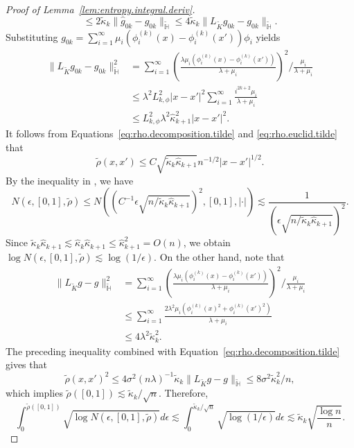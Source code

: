 \documentclass[12pt]{article}
\newcommand{\bbH}{\mathbb{H}}
\newcommand{\s}{\sum_{i=1}^{\infty}}
\theoremstyle{plain}
\theoremstyle{nonitalicremark}
\begin{document}
\begin{appendices}
\begin{proof}[Proof of Lemma~\ref{lem:entropy.integral.deriv}]
\begin{equation}
\leq 2\tilde{\kappa}_{k}\|\hat{g}_{0k}-g_{0k}\|_{\tilde{\bbH}} \leq 4\tilde{\kappa}_{k}\|L_{\tilde{K}}g_{0k}-g_{0k}\|_{\tilde{\bbH}}.
\end{equation}
Substituting $g_{0k}=\sum_{i=1}^{\infty}\mu_i(\phi^{(k)}_i(x)-\phi^{(k)}_i(x'))\phi_i$ yields
\begin{equation}\label{eq:rho.euclid.tilde}
\begin{split}
\|L_{\tilde{K}}g_{0k}-g_{0k}\|_{\tilde{\bbH}}^2&=  \sum_{i=1}^{\infty}\left(\frac{\lambda\mu_i(\phi^{(k)}_i(x)-\phi^{(k)}_i(x'))}{\lambda+\mu_i}\right)^2\bigg/\frac{\mu_i}{\lambda+\mu_i}\\
&\leq \lambda^2 L_{k,\phi}^2 |x-x'|^{2} \s \frac{i^{2k+2}\mu_i}{\lambda+\mu_i}\\
&\leq  L_{k,\phi}^2 \lambda^2 \hat{\kappa}_{k+1}^2 |x-x'|^{2}.
\end{split}
\end{equation}
It follows from Equations~\eqref{eq:rho.decomposition.tilde} and \eqref{eq:rho.euclid.tilde} that
\begin{equation}\label{eq:tilde.rho}
\tilde{\rho}(x,x')\leq C\sqrt{\tilde{\kappa}_{k}\hat{\kappa}_{k+1}} n^{-1/2} |x-x'|^{1/2}.
\end{equation}
By the inequality in \citet[p.~529]{ghosal2017fundamentals}, we have
\begin{equation}
N(\epsilon,[0,1],\tilde{\rho})\leq N\left(\left(C^{-1}\epsilon\sqrt{n/\tilde{\kappa}_{k}\hat{\kappa}_{k+1}}\right)^{2},[0,1],|\cdot|\right)\lesssim \frac{1}{(\epsilon\sqrt{n/\tilde{\kappa}_{k}\hat{\kappa}_{k+1}})^{2}}.
\end{equation}
Since $\tilde{\kappa}_{k}\hat{\kappa}_{k+1} \lesssim \hat{\kappa}_{k}\hat{\kappa}_{k+1} \leq \hat{\kappa}_{k+1}^2 =O(n)$, we obtain $\log N(\epsilon,[0,1],\tilde{\rho})\lesssim \log(1/\epsilon)$. On the other hand, note that
\begin{align}
\|L_{\tilde{K}}g-g\|_{\tilde{\bbH}}^2&=  \sum_{i=1}^{\infty}\left(\frac{\lambda\mu_i(\phi_i^{(k)}(x)-\phi_i^{(k)}(x'))}{\lambda+\mu_i}\right)^2\bigg/\frac{\mu_i}{\lambda+\mu_i}\\
&\leq \sum_{i=1}^{\infty}\frac{2\lambda^2\mu_i(\phi_i^{(k)}(x)^2+\phi_i^{(k)}(x')^2)}{\lambda+\mu_i}\\
&\leq 4\lambda^2\tilde{\kappa}_{k}^2.
\end{align}
The preceding inequality combined with Equation~\eqref{eq:rho.decomposition.tilde} gives that
\begin{equation}
\tilde{\rho}(x,x')^2\leq 4\sigma^2(n\lambda)^{-1}\tilde{\kappa}_{k}\|L_{\tilde{K}}g-g\|_{\tilde{\bbH}}\leq 8\sigma^2 \tilde{\kappa}_{k}^2 /n,
\end{equation}
which implies $\tilde{\rho}([0,1])\lesssim \tilde{\kappa}_{k}/\sqrt{n}$. Therefore,
\begin{equation}
\int_0^{\tilde{\rho}([0,1])} \sqrt{\log N(\epsilon,[0,1],\tilde{\rho})}d\epsilon \lesssim \int_0^{\tilde{\kappa}_{k}/\sqrt{n}} \sqrt{\log(1/\epsilon)}d\epsilon \lesssim \tilde{\kappa}_{k}\sqrt{\frac{\log n}{n}}.
\end{equation}
\end{proof}



\end{appendices}
\end{document}
